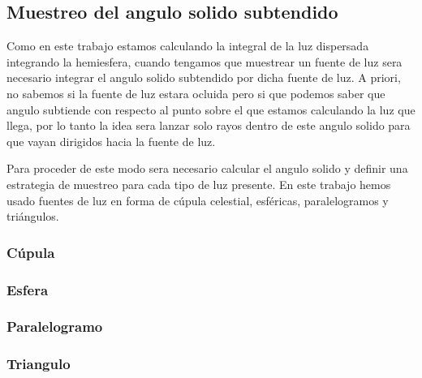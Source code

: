 \subsection{Muestreo del angulo solido subtendido}

Como en este trabajo estamos calculando la integral de la luz dispersada integrando la hemiesfera, cuando tengamos que muestrear un fuente de luz sera necesario integrar el angulo solido subtendido por dicha fuente de luz. A priori, no sabemos si la fuente de luz estara ocluida pero si que podemos saber que angulo subtiende con respecto al punto sobre el que estamos calculando la luz que llega, por lo tanto la idea sera lanzar solo rayos dentro de este angulo solido para que vayan dirigidos hacia la fuente de luz.

\medskip

Para proceder de este modo sera necesario calcular el angulo solido y definir una estrategia de muestreo para cada tipo de luz presente. En este trabajo hemos usado fuentes de luz en forma de cúpula celestial, esféricas, paralelogramos y triángulos.

\subsubsection{Cúpula}

\subsubsection{Esfera}

\subsubsection{Paralelogramo}

\subsubsection{Triangulo}




